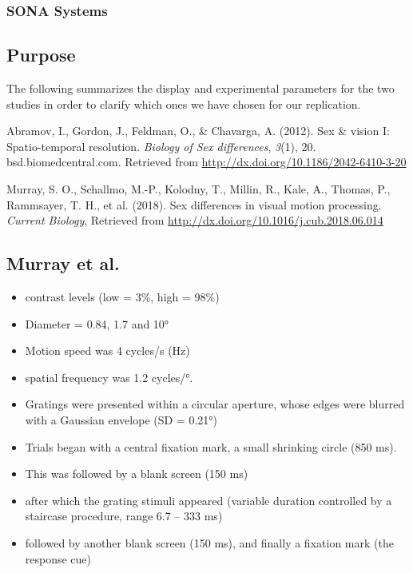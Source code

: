 \documentclass[]{article}
\providecommand{\tightlist}{%
  \setlength{\itemsep}{0pt}\setlength{\parskip}{0pt}}
\begin{document}
\subsubsection{SONA Systems}\label{sona-systems}

\subsection{Purpose}\label{purpose-2}

The following summarizes the display and experimental parameters for the
two studies in order to clarify which ones we have chosen for our
replication.

Abramov, I., Gordon, J., Feldman, O., \& Chavarga, A. (2012). Sex \&
vision I: Spatio-temporal resolution. \emph{Biology of Sex differences},
\emph{3}(1), 20. bsd.biomedcentral.com. Retrieved from
\url{http://dx.doi.org/10.1186/2042-6410-3-20}

Murray, S. O., Schallmo, M.-P., Kolodny, T., Millin, R., Kale, A.,
Thomas, P., Rammsayer, T. H., et al. (2018). Sex differences in visual
motion processing. \emph{Current Biology}, Retrieved from
\url{http://dx.doi.org/10.1016/j.cub.2018.06.014}

\subsection{Murray et al.}\label{murray-et-al.}

\begin{itemize}
\tightlist
\item
  contrast levels (low = 3\%, high = 98\%)
\item
  Diameter = 0.84, 1.7 and 10°
\item
  Motion speed was 4 cycles/s (Hz)
\item
  spatial frequency was 1.2 cycles/°.
\item
  Gratings were presented within a circular aperture, whose edges were
  blurred with a Gaussian envelope (SD = 0.21°)
\item
  Trials began with a central fixation mark, a small shrinking circle
  (850 ms).
\item
  This was followed by a blank screen (150 ms)
\item
  after which the grating stimuli appeared (variable duration controlled
  by a staircase procedure, range 6.7 -- 333 ms)
\item
  followed by another blank screen (150 ms), and finally a fixation mark
  (the response cue)
\end{itemize}
\end{document}
